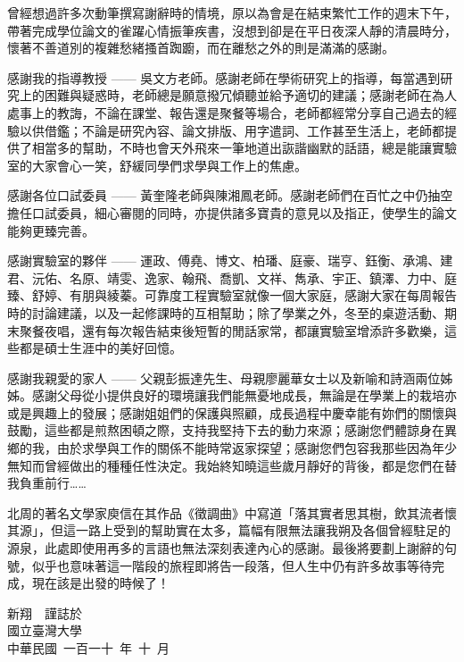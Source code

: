 
\begin{acknowledgement}

曾經想過許多次動筆撰寫謝辭時的情境，原以為會是在結束繁忙工作的週末下午，帶著完成學位論文的雀躍心情振筆疾書，沒想到卻是在平日夜深人靜的清晨時分，懷著不善道別的複雜愁緒搔首踟躕，而在離愁之外的則是滿滿的感謝。

感謝我的指導教授 ------ 吳文方老師。感謝老師在學術研究上的指導，每當遇到研究上的困難與疑惑時，老師總是願意撥冗傾聽並給予適切的建議；感謝老師在為人處事上的教誨，不論在課堂、報告還是聚餐等場合，老師都經常分享自己過去的經驗以供借鑑；不論是研究內容、論文排版、用字遣詞、工作甚至生活上，老師都提供了相當多的幫助，不時也會天外飛來一筆地道出詼諧幽默的話語，總是能讓實驗室的大家會心一笑，舒緩同學們求學與工作上的焦慮。

感謝各位口試委員 ------ 黃奎隆老師與陳湘鳳老師。感謝老師們在百忙之中仍抽空擔任口試委員，細心審閱的同時，亦提供諸多寶貴的意見以及指正，使學生的論文能夠更臻完善。

感謝實驗室的夥伴 ------ 運政、傅堯、博文、柏璠、庭豪、瑞亨、鈺衡、承鴻、建君、沅佑、名原、靖雯、逸家、翰飛、喬凱、文祥、雋承、宇正、鎮澤、力中、庭臻、舒婷、有朋與綾蓁。可靠度工程實驗室就像一個大家庭，感謝大家在每周報告時的討論建議，以及一起修課時的互相幫助；除了學業之外，冬至的桌遊活動、期末聚餐夜唱，還有每次報告結束後短暫的閒話家常，都讓實驗室增添許多歡樂，這些都是碩士生涯中的美好回憶。

感謝我親愛的家人 ------ 父親彭振達先生、母親廖麗華女士以及新喻和詩涵兩位姊姊。感謝父母從小提供良好的環境讓我們能無憂地成長，無論是在學業上的栽培亦或是興趣上的發展；感謝姐姐們的保護與照顧，成長過程中慶幸能有妳們的關懷與鼓勵，這些都是煎熬困頓之際，支持我堅持下去的動力來源；感謝您們體諒身在異鄉的我，由於求學與工作的關係不能時常返家探望；感謝您們包容我那些因為年少無知而曾經做出的種種任性決定。我始終知曉這些歲月靜好的背後，都是您們在替我負重前行……

北周的著名文學家庾信在其作品《徵調曲》中寫道「落其實者思其樹，飲其流者懷其源」，但這一路上受到的幫助實在太多，篇幅有限無法讓我朔及各個曾經駐足的源泉，此處即使用再多的言語也無法深刻表達內心的感謝。最後將要劃上謝辭的句號，似乎也意味著這一階段的旅程即將告一段落，但人生中仍有許多故事等待完成，現在該是出發的時候了！

\begin{flushright}
新翔　謹誌於 \\[0pt]
國立臺灣大學 \\[0pt]
中華民國~一百一十~年~十~月
\end{flushright}

\end{acknowledgement}